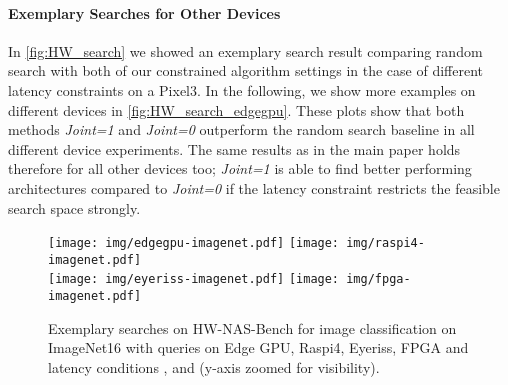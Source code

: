 \documentclass[runningheads]{llncs}
\begin{document}
\paragraph{Exemplary Searches for Other Devices}
In \autoref{fig:HW_search} we showed an exemplary search result comparing random search with both of our constrained algorithm settings in the case of different latency constraints on a Pixel3.
In the following, we show more examples on different devices in \autoref{fig:HW_search_edgegpu}.
These plots show that both methods \textit{Joint=1} and \textit{Joint=0} outperform the random search baseline in all different device experiments. The same results as in the main paper holds therefore for all other devices too; \textit{Joint=1} is able to find better performing architectures compared to \textit{Joint=0} if the latency constraint  restricts the feasible search space strongly.


\begin{figure}[ht]
	\centering
	\texttt{[image: img/edgegpu-imagenet.pdf]}
	\texttt{[image: img/raspi4-imagenet.pdf]}\\
	\texttt{[image: img/eyeriss-imagenet.pdf]}
	\texttt{[image: img/fpga-imagenet.pdf]}
	\caption{
		Exemplary searches on HW-NAS-Bench for image classification on ImageNet16 with  queries on Edge GPU, Raspi4, Eyeriss, FPGA and latency conditions ,  and  (y-axis zoomed for visibility).\label{fig:HW_search_edgegpu} \label{fig:HW_search_raspi4} \label{fig:HW_search_eyeriss} \label{fig:HW_search_fpga}}
\end{figure}
\end{document}
